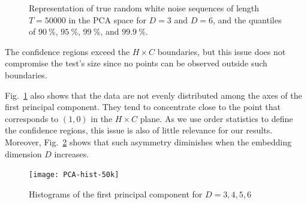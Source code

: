 \begin{figure}[hbt]
	\centering
	\caption{Representation of true random white noise sequences of length $T = 50000$ in the PCA space for $D = 3$ and $D = 6$, and the quantiles of $\SI{90}{\percent}$, $\SI{95}{\percent}$, $\SI{99}{\percent}$, and $\SI{99.9}{\percent}$.}
	\label{fig:HC-PCA}
\end{figure} 

The confidence regions exceed the $H \times C$ boundaries, but this issue does not compromise the test's size since no points can be observed outside such boundaries.

Fig.~\ref{fig:HC-PCA} also shows that the data are not evenly distributed among the axes of the first principal component.
They tend to concentrate close to the point that corresponds to $(1,0)$ in the $H\times C$ plane.
As we use order statistics to define the confidence regions, this issue is also of little relevance for our results.
Moreover, Fig.~\ref{fig:PCA-Hist} shows that such asymmetry diminishes when the embedding dimension $D$ increases.

\begin{figure}[hbt]
	\centering
	\texttt{[image: PCA-hist-50k]}
	\caption{Histograms of the first principal component for $D=3,4,5,6$}
	\label{fig:PCA-Hist}
\end{figure}

